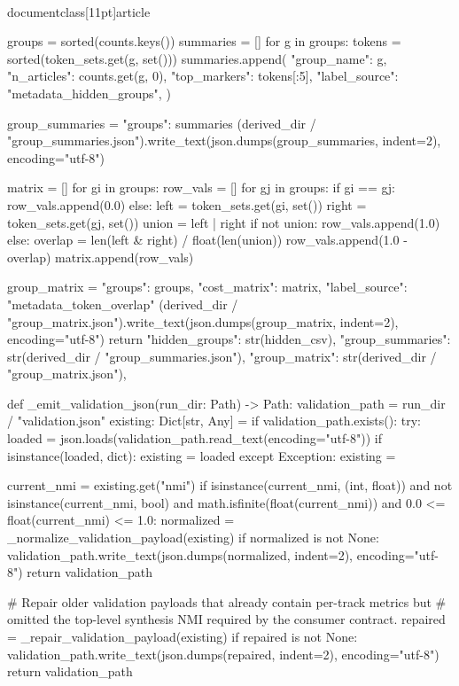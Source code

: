 \\documentclass[11pt]{article}
\begin{document}
\begin{CodeBlock}
    groups = sorted(counts.keys())
    summaries = []
    for g in groups:
        tokens = sorted(token_sets.get(g, set()))
        summaries.append(
            {
                "group_name": g,
                "n_articles": counts.get(g, 0),
                "top_markers": tokens[:5],
                "label_source": "metadata_hidden_groups",
            }
        )

    group_summaries = {"groups": summaries}
    (derived_dir / "group_summaries.json").write_text(json.dumps(group_summaries, indent=2), encoding="utf-8")

    matrix = []
    for gi in groups:
        row_vals = []
        for gj in groups:
            if gi == gj:
                row_vals.append(0.0)
            else:
                left = token_sets.get(gi, set())
                right = token_sets.get(gj, set())
                union = left | right
                if not union:
                    row_vals.append(1.0)
                else:
                    overlap = len(left & right) / float(len(union))
                    row_vals.append(1.0 - overlap)
        matrix.append(row_vals)

    group_matrix = {"groups": groups, "cost_matrix": matrix, "label_source": "metadata_token_overlap"}
    (derived_dir / "group_matrix.json").write_text(json.dumps(group_matrix, indent=2), encoding="utf-8")
    return {
        "hidden_groups": str(hidden_csv),
        "group_summaries": str(derived_dir / "group_summaries.json"),
        "group_matrix": str(derived_dir / "group_matrix.json"),
    }


def _emit_validation_json(run_dir: Path) -> Path:
    validation_path = run_dir / "validation.json"
    existing: Dict[str, Any] = {}
    if validation_path.exists():
        try:
            loaded = json.loads(validation_path.read_text(encoding="utf-8"))
            if isinstance(loaded, dict):
                existing = loaded
        except Exception:
            existing = {}

    current_nmi = existing.get("nmi")
    if isinstance(current_nmi, (int, float)) and not isinstance(current_nmi, bool) and math.isfinite(float(current_nmi)) and 0.0 <= float(current_nmi) <= 1.0:
        normalized = _normalize_validation_payload(existing)
        if normalized is not None:
            validation_path.write_text(json.dumps(normalized, indent=2), encoding="utf-8")
        return validation_path

    # Repair older validation payloads that already contain per-track metrics but
    # omitted the top-level synthesis NMI required by the consumer contract.
    repaired = _repair_validation_payload(existing)
    if repaired is not None:
        validation_path.write_text(json.dumps(repaired, indent=2), encoding="utf-8")
        return validation_path


\end{CodeBlock}
\end{document}
